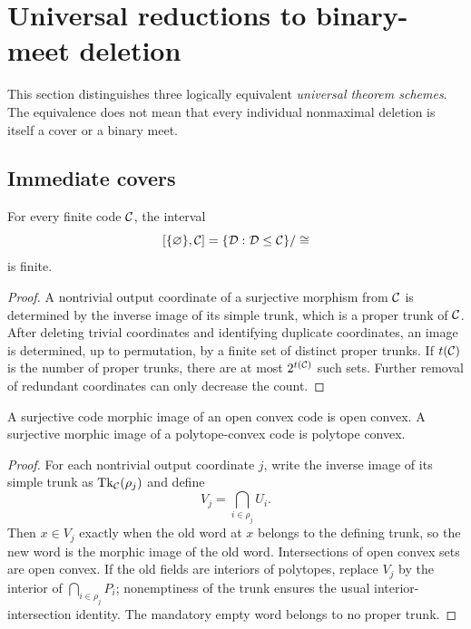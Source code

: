 \section{Universal reductions to binary-meet deletion}
\label{sec:universal-reductions}

This section distinguishes three logically equivalent \emph{universal theorem schemes}.  The equivalence does not mean that every individual nonmaximal deletion is itself a cover or a binary meet.

\subsection{Immediate covers}

\begin{lemma}
\label{lem:finite-lower-interval}
For every finite code $\mathcal C$, the interval
\[
 [\{\varnothing\},\mathcal C]=\{\mathcal D:\mathcal D\le\mathcal C\}/\cong
\]
is finite.
\end{lemma}

\begin{proof}
A nontrivial output coordinate of a surjective morphism from $\mathcal C$ is determined by the inverse image of its simple trunk, which is a proper trunk of $\mathcal C$.  After deleting trivial coordinates and identifying duplicate coordinates, an image is determined, up to permutation, by a finite set of distinct proper trunks.  If $t(\mathcal C)$ is the number of proper trunks, there are at most $2^{t(\mathcal C)}$ such sets.  Further removal of redundant coordinates can only decrease the count.
\end{proof}

\begin{lemma}
\label{lem:morphic-preservation}
A surjective code morphic image of an open convex code is open convex.  A surjective morphic image of a polytope-convex code is polytope convex.
\end{lemma}

\begin{proof}
For each nontrivial output coordinate $j$, write the inverse image of its simple trunk as $\operatorname{Tk}_\mathcal C(\rho_j)$ and define
\[
 V_j=\bigcap_{i\in\rho_j}U_i.
\]
Then $x\in V_j$ exactly when the old word at $x$ belongs to the defining trunk, so the new word is the morphic image of the old word.  Intersections of open convex sets are open convex.  If the old fields are interiors of polytopes, replace $V_j$ by the interior of $\bigcap_{i\in\rho_j}P_i$; nonemptiness of the trunk ensures the usual interior-intersection identity.  The mandatory empty word belongs to no proper trunk.
\end{proof}

